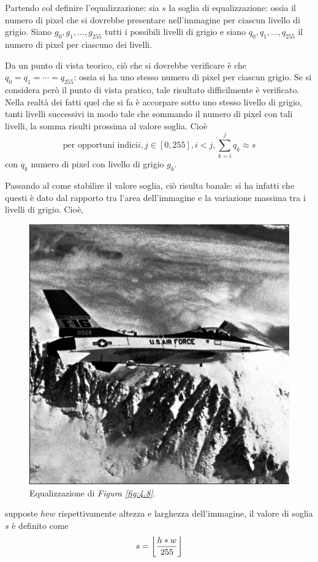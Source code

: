 \documentclass{subfiles}
\begin{document}
Partendo col definire l'equalizzazione: sia \(s\) la soglia di equalizzazione: ossia il numero di pixel che si dovrebbe presentare nell'immagine per ciascun livello di grigio.
Siano \(g_{0}, g_{1}, \ldots, g_{255}\) tutti i possibili livelli di grigio e siano \(q_{0}, q_{1}, \ldots, q_{255}\) il numero di pixel per ciascuno dei livelli.

Da un punto di vista teorico, ciò che si dovrebbe verificare è che \(q_{0} = q_{1} = \cdots = q_{255}\): ossia si ha uno stesso numero di pixel per ciascun grigio.
Se si considera però il punto di vista pratico, tale risultato difficilmente è verificato.
Nella realtà dei fatti quel che si fa è accorpare sotto uno stesso livello di grigio, tanti livelli successivi in modo tale che sommando il numero di pixel con tali livelli,
la somma risulti prossima al valore soglia. Cioè
\[
    \text{per opportuni indici} i,j \in [0, 255], i < j, \sum\limits_{k = i}^{j}{q_{k}} \approx s
\]
con \(q_{k}\) numero di pixel con livello di grigio \(g_{k}\).

Passando al come stabilire il valore soglia, ciò risulta banale: si ha infatti che questi è dato dal rapporto tra l'area dell'immagine e la variazione massima tra i livelli di grigio.
Cioè,
\begin{figure}
    \centering
    \includegraphics[scale = 0.325]{../Images/Airplane/Equalised Airplane.png}
    \caption{Equalizzazione di \emph{Figura \ref{fig:4.8}}.}
    \label{fig:8.3}
\end{figure}
supposte \(h \text{e} w\) rispettivamente altezza e larghezza dell'immagine, il valore di soglia \(s\) è definito come
\[
    s = \left\lfloor \frac{h * w}{255} \right\rfloor
\]
\end{document}
